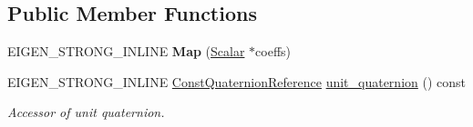 \subsection*{Public Member Functions}
\begin{DoxyCompactItemize}
\item 
E\+I\+G\+E\+N\+\_\+\+S\+T\+R\+O\+N\+G\+\_\+\+I\+N\+L\+I\+NE {\bfseries Map} (\hyperlink{class_sophus_1_1_s_o3_group_base_a31bf31815c195b7150da8a8e8c6f0189}{Scalar} $\ast$coeffs)\hypertarget{class_eigen_1_1_map_3_01_sophus_1_1_s_o3_group_3_01___scalar_01_4_00_01___options_01_4_a13c62e8dbdb994debb0ce6a7931a3a15}{}\label{class_eigen_1_1_map_3_01_sophus_1_1_s_o3_group_3_01___scalar_01_4_00_01___options_01_4_a13c62e8dbdb994debb0ce6a7931a3a15}

\item 
E\+I\+G\+E\+N\+\_\+\+S\+T\+R\+O\+N\+G\+\_\+\+I\+N\+L\+I\+NE \hyperlink{class_sophus_1_1_s_o3_group_base_a8a5a23aee10f2850a5894b7c1f5e6654}{Const\+Quaternion\+Reference} \hyperlink{class_eigen_1_1_map_3_01_sophus_1_1_s_o3_group_3_01___scalar_01_4_00_01___options_01_4_ae35daf5e45b340c471fac3f3d2b03c4d}{unit\+\_\+quaternion} () const 
\begin{DoxyCompactList}\small\item\em Accessor of unit quaternion. \end{DoxyCompactList}\end{DoxyCompactItemize}
